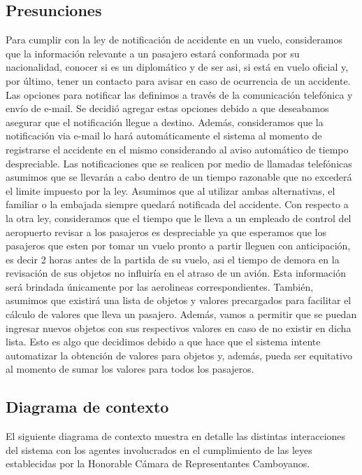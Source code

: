 \subsection{Presunciones}
Para cumplir con la ley de notificación de accidente en un vuelo, consideramos que la información 
relevante a un pasajero estará conformada por su nacionalidad, conocer si es un diplomático y de ser
asi, si está en vuelo oficial y, por último, tener un contacto para avisar en caso de ocurrencia de
un accidente.
Las opciones para notificar las definimos a través de la comunicación telefónica y envío de e-mail.
Se decidió agregar estas opciones debido a que deseabamos asegurar que el notificación llegue
a destino.
Además, consideramos que la notificación via e-mail lo hará automáticamente el sistema al momento de 
registrarse el accidente en el mismo considerando al aviso automático de tiempo despreciable. 
Las notificaciones que se realicen por medio de llamadas telefónicas asumimos que se llevarán a cabo
dentro de un tiempo razonable que no excederá el limite impuesto por la ley.
Asumimos que al utilizar ambas alternativas, el familiar o la embajada siempre quedará notificada del
accidente.
Con respecto a la otra ley, consideramos que el tiempo que le lleva a un empleado de control
del aeropuerto revisar a los pasajeros es despreciable ya que esperamos que los pasajeros que 
esten por tomar un vuelo pronto a partir lleguen con anticipación, es decir 2 horas antes de 
la partida de su vuelo, asi el tiempo de demora en la revisación de sus objetos no influiría 
en el atraso de un avión. Esta información será brindada únicamente por las aerolineas correspondientes.
También, asumimos que existirá una lista de objetos y valores precargados para facilitar el cálculo de 
valores que lleva un pasajero. Además, vamos a permitir que se puedan ingresar nuevos objetos con sus
respectivos valores en caso de no existir en dicha lista. Esto es algo que decidimos debido a que 
hace que el sistema intente automatizar la obtención de valores para objetos y, además, pueda ser 
equitativo al momento de sumar los valores para todos los pasajeros.

\subsection{Diagrama de contexto}
El siguiente diagrama de contexto muestra en detalle las distintas interacciones del sistema con los 
agentes involucrados en el cumplimiento de las leyes establecidas por la Honorable Cámara de 
Representantes Camboyanos.

